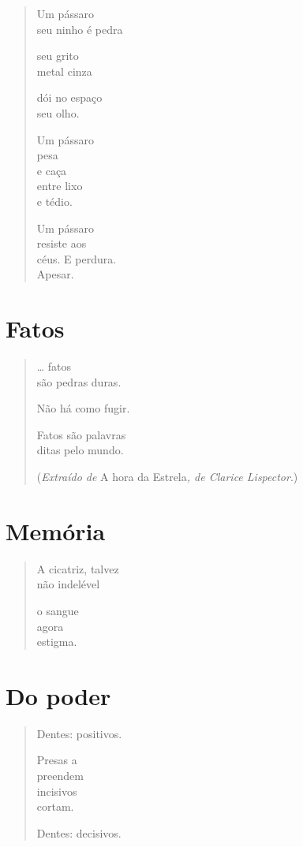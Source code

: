 \begin{verse}
Um pássaro\\
seu ninho é pedra

seu grito\\
metal cinza

dói no espaço\\
seu olho.

Um pássaro\\
pesa\\
e caça\\
entre lixo\\
e tédio.

Um pássaro\\
resiste aos\\
céus. E perdura.\\
Apesar.
\end{verse}

\chapter{Fatos}

\begin{verse}
\ldots{} fatos\\
são pedras duras.

Não há como fugir.

Fatos são palavras\\
ditas pelo mundo.

{\small (\emph{Extraído de} A hora da Estrela\emph{, de Clarice Lispector}.)}
\end{verse}

\chapter{Memória}

\begin{verse}
A cicatriz, talvez\\
não indelével

o sangue\\
agora\\
estigma.
\end{verse}

\chapter{Do poder}

\begin{verse}
Dentes: positivos.

Presas a\\
preendem\\
incisivos\\
cortam.

Dentes: decisivos.
\end{verse}

